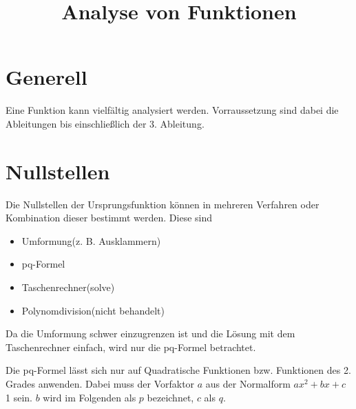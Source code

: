\documentclass[10pt,a4paper]{article}
\begin{document}
\setlength{\parindent}{0cm}

\title{Analyse von Funktionen}

\makeatletter
\def\@maketitle{%
  \newpage
  \null
  \vskip 2em%
  \begin{center}%
  \let \footnote \thanks
    {\Huge\bfseries\@title \par}%
    \vskip 1.5em%
    {\large
      \lineskip .5em%
      \begin{tabular}[t]{c}%
        \@author
      \end{tabular}\par}%
    \vskip 1em%
    {\large \@date}%
  \end{center}%
  \par
  \vskip 1.5em}
\makeatother

\author{}
\date{}

\maketitle

\section*{Generell}

Eine Funktion kann vielfältig analysiert werden. Vorraussetzung sind dabei die Ableitungen
bis einschließlich der 3. Ableitung.

\section*{Nullstellen}
Die Nullstellen der Ursprungsfunktion können in mehreren Verfahren oder Kombination dieser bestimmt werden. Diese sind
\begin{itemize}
	\item Umformung(z. B. Ausklammern)
	\item pq-Formel
	\item Taschenrechner(solve)
	\item Polynomdivision(nicht behandelt)
\end{itemize}

Da die Umformung schwer einzugrenzen ist und die Lösung mit dem Taschenrechner einfach, wird nur die pq-Formel betrachtet.

Die pq-Formel lässt sich nur auf Quadratische Funktionen bzw. Funktionen des 2. Grades anwenden.
Dabei muss der Vorfaktor $a$ aus der Normalform $ax^2 + bx + c$ 1 sein.
$b$ wird im Folgenden als $p$ bezeichnet, $c$ als $q$.
\end{document}
